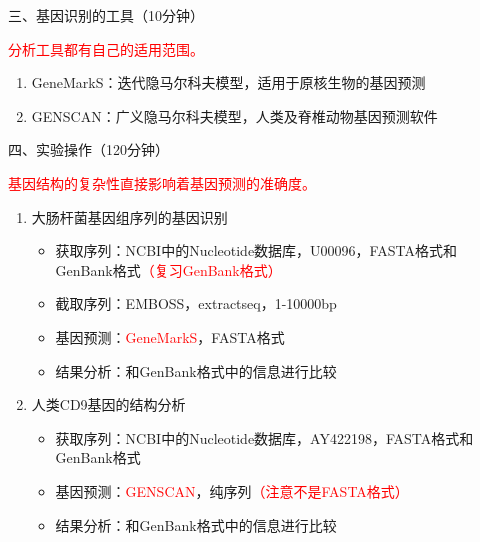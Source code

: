 \documentclass{TIJMUjiaoanSY}
\begin{document}
\vspace*{0.2cm}
\noindent
三、基因识别的工具（10分钟）

\textcolor{red}{分析工具都有自己的适用范围。}
\begin{enumerate}
  \item GeneMarkS：迭代隐马尔科夫模型，适用于原核生物的基因预测
  \item GENSCAN：广义隐马尔科夫模型，人类及脊椎动物基因预测软件
\end{enumerate}


\otherTail
\newpage
\otherHeader


\noindent
四、实验操作（120分钟）

\textcolor{red}{基因结构的复杂性直接影响着基因预测的准确度。}
\begin{enumerate}
  \item 大肠杆菌基因组序列的基因识别
    \begin{itemize}
      \item 获取序列：NCBI中的Nucleotide数据库，U00096，FASTA格式和GenBank格式\textcolor{red}{（复习GenBank格式）}
      \item 截取序列：EMBOSS，extractseq，1-10000bp
      \item 基因预测：\textcolor{red}{GeneMarkS}，FASTA格式
      \item 结果分析：和GenBank格式中的信息进行比较
    \end{itemize}
  \item 人类CD9基因的结构分析
    \begin{itemize}
      \item 获取序列：NCBI中的Nucleotide数据库，AY422198，FASTA格式和GenBank格式
      \item 基因预测：\textcolor{red}{GENSCAN}，纯序列\textcolor{red}{（注意不是FASTA格式）}
      \item 结果分析：和GenBank格式中的信息进行比较
    \end{itemize}
\end{enumerate}

\otherTail
\end{document}
